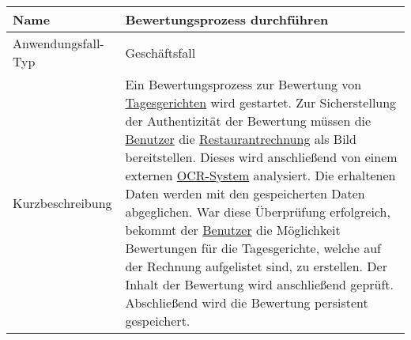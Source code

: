 \begin{table}[H]
    \centering
    \label{bewertungsprozessDurchfuehren}
    \begin{tabularx}{\textwidth}{| l | X |}
        \hline
        Name               & Bewertungsprozess durchführen                                                                                                                                                                                                                                                                                                                                                                                                                                                                                                                                                                                                                                                                                                     \\
        \hline
        Anwendungsfall-Typ & Geschäftsfall                                                                                                                                                                                                                                                                                                                                                                                                                                                                                                                                                                                                                                                                                                                     \\
        \hline
        Kurzbeschreibung   & Ein Bewertungsprozess zur Bewertung von \hyperref[gls:tagesgericht]{Tagesgerichten} wird gestartet. Zur Sicherstellung der Authentizität der Bewertung müssen die \hyperref[gls:nutzer]{Benutzer} die \hyperref[gls:restaurantRechnung]{Restaurantrechnung} als Bild bereitstellen. Dieses wird anschließend von einem externen \hyperref[gls:ocr-System]{OCR-System} analysiert. Die erhaltenen Daten werden mit den gespeicherten Daten abgeglichen. War diese Überprüfung erfolgreich, bekommt der \hyperref[gls:nutzer]{Benutzer} die Möglichkeit Bewertungen für die Tagesgerichte, welche auf der Rechnung aufgelistet sind, zu erstellen. Der Inhalt der Bewertung wird anschließend geprüft. Abschließend wird die Bewertung persistent gespeichert. \\

\end{tabularx}
\end{table}
